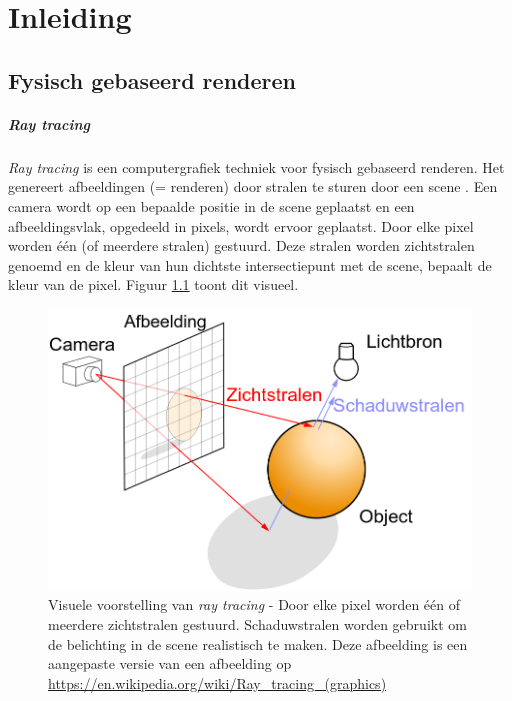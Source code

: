 \chapter{Inleiding}
\label{hoofdstuk:inleiding}

\section{Fysisch gebaseerd renderen}
\paragraph{Ray tracing}
\textit{Ray tracing} \cite{appel1968some} is een computergrafiek techniek voor fysisch gebaseerd renderen. Het genereert afbeeldingen (= renderen) door stralen te sturen door een scene \cite{Suffern:2007:RTG:1324795}. Een camera wordt op een bepaalde positie in de scene geplaatst en een afbeeldingsvlak, opgedeeld in pixels, wordt ervoor geplaatst. Door elke pixel worden één (of meerdere stralen) gestuurd. Deze stralen worden zichtstralen genoemd en de kleur van hun dichtste intersectiepunt met de scene, bepaalt de kleur van de pixel. Figuur \ref{fig:raytracing} toont dit visueel.\\

\begin{figure}
    \centering
    \includegraphics[width=0.5\linewidth]{img/ray-tracing}
    \caption[Visuele voorstelling van \textit{ray tracing}]%
{Visuele voorstelling van \textit{ray tracing} - \small Door elke pixel worden één of meerdere zichtstralen gestuurd. Schaduwstralen worden gebruikt om de belichting in de scene realistisch te maken. Deze afbeelding is een aangepaste versie van een afbeelding op \url{https://en.wikipedia.org/wiki/Ray_tracing_(graphics)}}
    \label{fig:raytracing}    
\end{figure}

